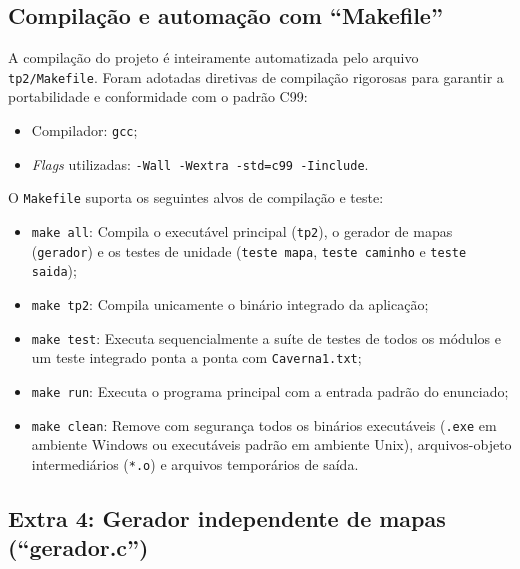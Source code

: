 \documentclass[12pt,a4paper]{article}
\makeatletter
\DeclareRobustCommand{\_}{%
  \ifmmode
    \nfss@text{\textunderscore}%
  \else
    \textunderscore\allowbreak
  \fi
}
\makeatother
\begin{document}

\subsection{Compilação e automação com ``Makefile''}

A compilação do projeto é inteiramente automatizada pelo arquivo \texttt{tp2/Makefile}. Foram adotadas diretivas de compilação rigorosas para garantir a portabilidade e conformidade com o padrão C99:
\begin{itemize}
    \item Compilador: \texttt{gcc};
    \item \textit{Flags} utilizadas: \texttt{-Wall -Wextra -std=c99 -Iinclude}.
\end{itemize}

O \texttt{Makefile} suporta os seguintes alvos de compilação e teste:
\begin{itemize}
    \item \texttt{make all}: Compila o executável principal (\texttt{tp2}), o gerador de mapas (\texttt{gerador}) e os testes de unidade (\texttt{teste\_mapa}, \texttt{teste\_caminho} e \texttt{teste\_saida});
    \item \texttt{make tp2}: Compila unicamente o binário integrado da aplicação;
    \item \texttt{make test}: Executa sequencialmente a suíte de testes de todos os módulos e um teste integrado ponta a ponta com \texttt{Caverna1.txt};
    \item \texttt{make run}: Executa o programa principal com a entrada padrão do enunciado;
    \item \texttt{make clean}: Remove com segurança todos os binários executáveis (\texttt{.exe} em ambiente Windows ou executáveis padrão em ambiente Unix), arquivos-objeto intermediários (\texttt{*.o}) e arquivos temporários de saída.
\end{itemize}


\subsection{Extra 4: Gerador independente de mapas (``gerador.c'')}
\end{document}
